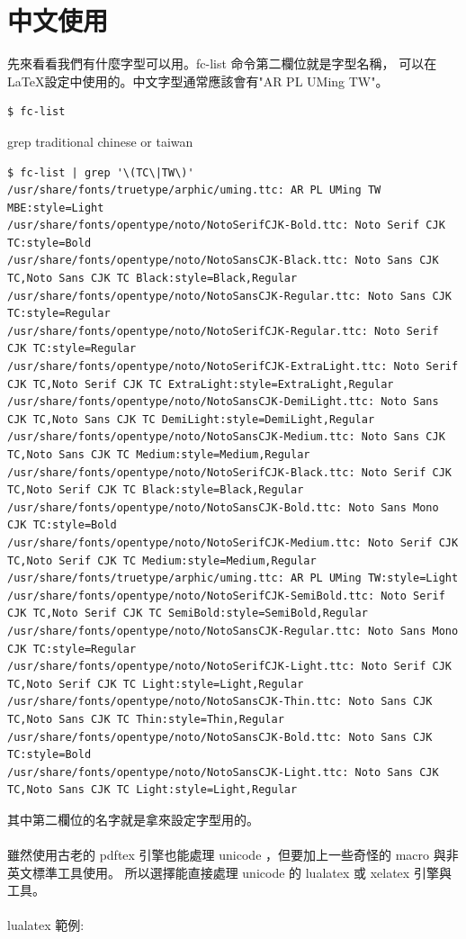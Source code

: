 \section{中文使用}
先來看看我們有什麼字型可以用。fc-list 命令第二欄位就是字型名稱，
可以在 \LaTeX 設定中使用的。中文字型通常應該會有"AR PL UMing TW"。
\begin{verbatim}
$ fc-list 
\end{verbatim}
grep traditional chinese or taiwan
\begin{scriptsize}
\begin{verbatim}
$ fc-list | grep '\(TC\|TW\)'
/usr/share/fonts/truetype/arphic/uming.ttc: AR PL UMing TW MBE:style=Light
/usr/share/fonts/opentype/noto/NotoSerifCJK-Bold.ttc: Noto Serif CJK TC:style=Bold
/usr/share/fonts/opentype/noto/NotoSansCJK-Black.ttc: Noto Sans CJK TC,Noto Sans CJK TC Black:style=Black,Regular
/usr/share/fonts/opentype/noto/NotoSansCJK-Regular.ttc: Noto Sans CJK TC:style=Regular
/usr/share/fonts/opentype/noto/NotoSerifCJK-Regular.ttc: Noto Serif CJK TC:style=Regular
/usr/share/fonts/opentype/noto/NotoSerifCJK-ExtraLight.ttc: Noto Serif CJK TC,Noto Serif CJK TC ExtraLight:style=ExtraLight,Regular
/usr/share/fonts/opentype/noto/NotoSansCJK-DemiLight.ttc: Noto Sans CJK TC,Noto Sans CJK TC DemiLight:style=DemiLight,Regular
/usr/share/fonts/opentype/noto/NotoSansCJK-Medium.ttc: Noto Sans CJK TC,Noto Sans CJK TC Medium:style=Medium,Regular
/usr/share/fonts/opentype/noto/NotoSerifCJK-Black.ttc: Noto Serif CJK TC,Noto Serif CJK TC Black:style=Black,Regular
/usr/share/fonts/opentype/noto/NotoSansCJK-Bold.ttc: Noto Sans Mono CJK TC:style=Bold
/usr/share/fonts/opentype/noto/NotoSerifCJK-Medium.ttc: Noto Serif CJK TC,Noto Serif CJK TC Medium:style=Medium,Regular
/usr/share/fonts/truetype/arphic/uming.ttc: AR PL UMing TW:style=Light
/usr/share/fonts/opentype/noto/NotoSerifCJK-SemiBold.ttc: Noto Serif CJK TC,Noto Serif CJK TC SemiBold:style=SemiBold,Regular
/usr/share/fonts/opentype/noto/NotoSansCJK-Regular.ttc: Noto Sans Mono CJK TC:style=Regular
/usr/share/fonts/opentype/noto/NotoSerifCJK-Light.ttc: Noto Serif CJK TC,Noto Serif CJK TC Light:style=Light,Regular
/usr/share/fonts/opentype/noto/NotoSansCJK-Thin.ttc: Noto Sans CJK TC,Noto Sans CJK TC Thin:style=Thin,Regular
/usr/share/fonts/opentype/noto/NotoSansCJK-Bold.ttc: Noto Sans CJK TC:style=Bold
/usr/share/fonts/opentype/noto/NotoSansCJK-Light.ttc: Noto Sans CJK TC,Noto Sans CJK TC Light:style=Light,Regular
\end{verbatim}
\end{scriptsize}
其中第二欄位的名字就是拿來設定字型用的。
\\\\
雖然使用古老的 pdftex 引擎也能處理 unicode ，但要加上一些奇怪的 macro
與非英文標準工具使用。 所以選擇能直接處理 unicode 的 lualatex 或 
xelatex 引擎與工具。
\\\\
lualatex 範例:

